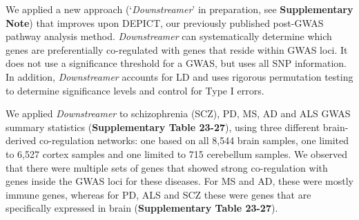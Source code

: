 We applied a new approach (‘\textit{Downstreamer}’ in preparation, see \textbf{Supplementary Note}) that improves upon DEPICT, our previously published post-GWAS pathway analysis method\cite{persBiologicalInterpretationGenomewide2015}. \textit{Downstreamer} can systematically determine which genes are preferentially co-regulated with genes that reside within GWAS loci. It does not use a significance threshold for a GWAS, but uses all SNP information. In addition, \textit{Downstreamer} accounts for LD and uses rigorous permutation testing to determine significance levels and control for Type I errors.

We applied \textit{Downstreamer} to schizophrenia (SCZ)\cite{ripkeBiologicalInsights1082014}, PD\cite{nallsIdentificationNovelRisk2019}, MS\cite{consortiumMultipleSclerosisGenomic2019}, AD\cite{kunkleGeneticMetaanalysisDiagnosed2019} and ALS GWAS summary statistics (\textbf{Supplementary Table 23-27}), using three different brain-derived co-regulation networks: one based on all 8,544 brain samples, one limited to 6,527 cortex samples and one limited to 715 cerebellum samples. We observed that there were multiple sets of genes that showed strong co-regulation with genes inside the GWAS loci for these diseases. For MS and AD, these were mostly immune genes, whereas for PD, ALS and SCZ these were genes that are specifically expressed in brain (\textbf{Supplementary Table 23-27}).  

